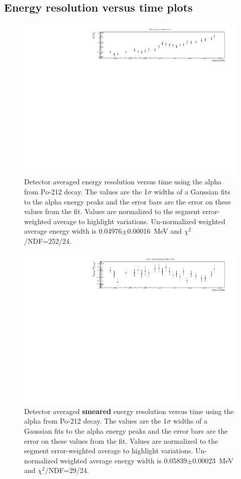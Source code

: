 \subsection{Energy resolution versus time plots}
\begin{figure}[!h]
\centering
\includegraphics[width=1.05\textwidth]{figures/PubBiPo212EresvsT.pdf}
\caption{\label{fig:EresvsT212}Detector averaged energy resolution versus time using the alpha from Po-212 decay. The values are the 1$\sigma$ widths of a Gaussian fits to the alpha energy peaks and the error bars are the error on these values from the fit. Values are normalized to the segment error-weighted average to highlight variations. Un-normalized weighted average energy width is 0.04976$\pm$0.00016~MeV and $\chi^2$/NDF=252/24.}
\end{figure}
\begin{figure}[!h]
\centering
\includegraphics[width=1.05\textwidth]{figures/PubBiPo212EsmearresvsT.pdf}
\caption{\label{fig:EsmearresvsT212}Detector averaged {\bf smeared} energy resolution versus time using the alpha from Po-212 decay. The values are the 1$\sigma$ widths of a Gaussian fits to the alpha energy peaks and the error bars are the error on these values from the fit. Values are normalized to the segment error-weighted average to highlight variations. Un-normalized weighted average energy width is 0.05839$\pm$0.00023~MeV and $\chi^2$/NDF=29/24.}
\end{figure}
